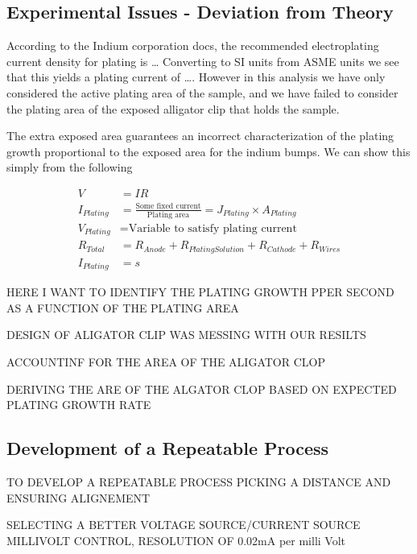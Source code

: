 \subsection{Experimental Issues - Deviation from Theory}

According to the Indium corporation docs, the recommended electroplating current density for plating is \dots
Converting to SI units from ASME units we see that this yields a plating current of \dots . However in this analysis we have only considered the active plating area of the sample, and we have failed to consider the plating area of the exposed alligator clip that holds the sample.

The extra exposed area guarantees an incorrect characterization of the plating growth proportional to the exposed area for the indium bumps. We can show this simply from the following

\begin{equation}\tag{A}
    \begin{split}
        V &= I R \\
        I_{Plating} &= \frac{\text{Some fixed current}}{\text{Plating area}}  = J_{Plating} \times A_{Plating} \\
        V_{Plating} &= \text{Variable to satisfy plating current} \\
        R_{Total} &= R_{Anode} + R_{Plating Solution} + R_{Cathode} + R_{Wires} \\
        I_{Plating} &= s
    \end{split}
\end{equation}



HERE I WANT TO IDENTIFY THE PLATING GROWTH PPER SECOND AS A FUNCTION OF THE PLATING AREA

DESIGN OF ALIGATOR CLIP WAS MESSING WITH OUR RESILTS

ACCOUNTINF FOR THE AREA OF THE ALIGATOR CLOP

DERIVING THE ARE OF THE ALGATOR CLOP BASED ON EXPECTED PLATING GROWTH RATE



\subsection{Development of a Repeatable Process}

TO DEVELOP A REPEATABLE PROCESS PICKING A DISTANCE AND ENSURING ALIGNEMENT

SELECTING A BETTER VOLTAGE SOURCE/CURRENT SOURCE MILLIVOLT CONTROL, RESOLUTION OF 0.02mA per milli Volt

